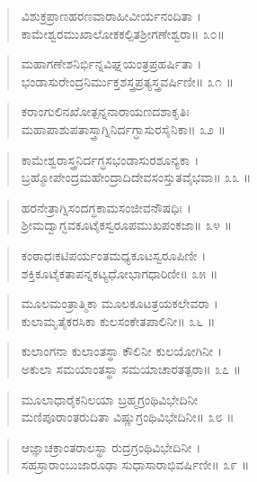 \begin{verse}
ವಿಶುಕ್ರಪ್ರಾಣಹರಣವಾರಾಹೀವೀರ್ಯನಂದಿತಾ ।\\ಕಾಮೇಶ್ವರಮುಖಾಲೋಕಕಲ್ಪಿತಶ್ರೀಗಣೇಶ್ವರಾ\num{॥ ೩೦॥}
\end{verse}

\begin{verse}
ಮಹಾಗಣೇಶನಿರ್ಭಿನ್ನವಿಘ್ನಯಂತ್ರಪ್ರಹರ್ಷಿತಾ ।\\ಭಂಡಾಸುರೇಂದ್ರನಿರ್ಮುಕ್ತಶಸ್ತ್ರಪ್ರತ್ಯಸ್ತ್ರವರ್ಷಿಣೀ\num{॥ ೩೧ ॥}
\end{verse}

\begin{verse}
ಕರಾಂಗುಲಿನಖೋತ್ಪನ್ನನಾರಾಯಣದಶಾಕೃತಿಃ \\ಮಹಾಪಾಶುಪತಾಸ್ತ್ರಾಗ್ನಿನಿರ್ದಗ್ಧಾಸುರಸೈನಿಕಾ\num{॥ ೩೨ ॥}
\end{verse}

\begin{verse}
ಕಾಮೇಶ್ವರಾಸ್ತ್ರನಿರ್ದಗ್ಧಸಭಂಡಾಸುರಶೂನ್ಯಕಾ ।\\ಬ್ರಹ್ಮೋಪೇಂದ್ರಮಹೇಂದ್ರಾದಿದೇವಸಂಸ್ತುತವೈಭವಾ\num{॥ ೩೩ ॥}
\end{verse}

\begin{verse}
ಹರನೇತ್ರಾಗ್ನಿಸಂದಗ್ಧಕಾಮಸಂಜೀವನೌಷಧಿಃ ।\\ಶ್ರೀಮದ್ವಾಗ್ಭವಕೂಟೈಕಸ್ವರೂಪಮುಖಪಂಕಜಾ\num{॥ ೩೪ ॥}
\end{verse}

\begin{verse}
ಕಂಠಾಧಃಕಟಿಪರ್ಯಂತಮಧ್ಯಕೂಟಸ್ವರೂಪಿಣೀ ।\\ಶಕ್ತಿಕೂಟೈಕತಾಪನ್ನಕಟ್ಯಧೋಭಾಗಧಾರಿಣೀ\num{॥ ೩೫ ॥}
\end{verse}

\begin{verse}
ಮೂಲಮಂತ್ರಾತ್ಮಿಕಾ ಮೂಲಕೂಟತ್ರಯಕಲೇವರಾ ।\\ಕುಲಾಮೃತೈಕರಸಿಕಾ  ಕುಲಸಂಕೇತಪಾಲಿನೀ\num{॥ ೩೬ ॥}
\end{verse}

\begin{verse}
ಕುಲಾಂಗನಾ ಕುಲಾಂತಸ್ಥಾ ಕೌಲಿನೀ ಕುಲಯೋಗಿನೀ ।\\ಅಕುಲಾ ಸಮಯಾಂತಸ್ಥಾ ಸಮಯಾಚಾರತತ್ಪರಾ\num{॥ ೩೭ ॥}
\end{verse}

\begin{verse}
ಮೂಲಾಧಾರೈಕನಿಲಯಾ ಬ್ರಹ್ಮಗ್ರಂಥಿವಿಭೇದಿನೀ \\ಮಣಿಪೂರಾಂತರುದಿತಾ ವಿಷ್ಣುಗ್ರಂಥಿವಿಭೇದಿನೀ\num{॥ ೩೮ ॥}
\end{verse}

\begin{verse}
ಆಜ್ಞಾಚಕ್ರಾಂತರಾಲಸ್ಥಾ ರುದ್ರಗ್ರಂಥಿವಿಭೇದಿನೀ ।\\ಸಹಸ್ರಾರಾಂಬುಜಾರೂಢಾ ಸುಧಾಸಾರಾಭಿವರ್ಷಿಣೀ\num{॥ ೩೯ ॥}
\end{verse}

